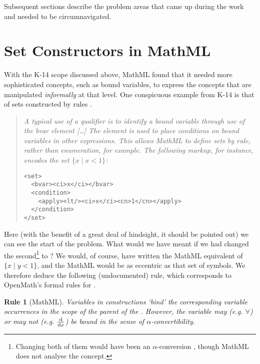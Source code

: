 \documentclass{llncs}
\newtheorem{Rule}{Rule}
\begin{document}
Subsequent sections describe the problem areas that came up during the work and
needed to be circumnavigated.


\section{Set Constructors in MathML}\label{sec:setconstructors}

With the K-14 scope discussed above, MathML found that it needed more sophisticated
concepts, such as bound variables, to express the concepts that are manipulated
{\emph{informally}} at that level. One conspicuous example from K-14 is that of
sets constructed by rules \cite[4.2.1.8]{WorldWideWebConsortium2003b}.
\begin{quotation}\noindent\em 
  A typical use of a qualifier is to identify a bound variable through use of the bvar
  element [\ldots] The {} element is used to place conditions on bound
  variables in other expressions. This allows MathML to define sets by rule, rather than
  enumeration, for example. The following markup, for instance, encodes the
set $\{x \mid x <
  1\}$:
\begin{lstlisting}[language=MathML2]
<set>
  <bvar><ci>x</ci></bvar>
  <condition>
    <apply><lt/><ci>x</ci><cn>1</cn></apply>
  </condition>
</set>
\end{lstlisting}
\end{quotation}
\par\noindent
Here (with the benefit of a great deal of hindsight, it should be pointed out) we can see
the start of the problem. What would we have meant if we had changed the
second\footnote{Changing both of them would have been an $\alpha$-conversion\iffull{} \cite[Definition 2.1.11]{Barendregt1984}, though MathML does not analyse the concept\fi.}
{} to {}? We would, of course, have written the MathML equivalent of
$\{x \mid y < 1\}$, and the MathML would be as eccentric as that set of symbols.
We therefore deduce the following (undocumented) rule, which corresponds to
OpenMath's formal rules for {}.
\begin{Rule}[MathML]\label{rule:MML}
  Variables in {} constructions `bind' the corresponding variable occurrences in
  the scope of the parent of the {}. However, the variable may
(e.g. $\forall$) or may not (e.g. $\frac{\rm d}{{\rm d}x}$) be bound in the
sense of $\alpha$-convertibility.
\end{Rule}
\end{document}
